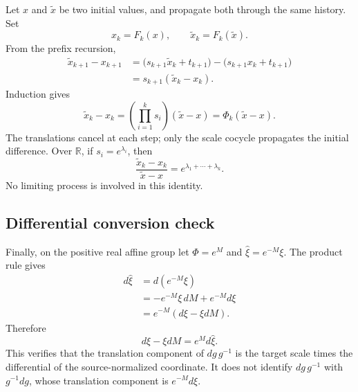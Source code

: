 Let $x$ and $\widetilde x$ be two initial values, and propagate both through
the same history.  Set
\[
  x_k=F_k(x),
  \qquad
  \widetilde x_k=F_k(\widetilde x).
\]
From the prefix recursion,
\begin{align*}
  \widetilde x_{k+1}-x_{k+1}
  &=\bigl(s_{k+1}\widetilde x_k+t_{k+1}\bigr)
    -\bigl(s_{k+1}x_k+t_{k+1}\bigr)\\
  &=s_{k+1}(\widetilde x_k-x_k).
\end{align*}
Induction gives
\begin{equation}
  \widetilde x_k-x_k
  =\left(\prod_{i=1}^{k}s_i\right)(\widetilde x-x)
  =\Phi_k(\widetilde x-x).
  \label{eq:appendix-prefix-perturbation}
\end{equation}
The translations cancel at each step; only the scale cocycle propagates the
initial difference.  Over $\mathbb R$, if $s_i=e^{\lambda_i}$, then
\[
  \frac{\widetilde x_k-x_k}{\widetilde x-x}
  =e^{\lambda_1+\cdots+\lambda_k}.
\]
No limiting process is involved in this identity.

\subsection{Differential conversion check}

Finally, on the positive real affine group let $\Phi=e^M$ and
$\widehat\xi=e^{-M}\xi$.  The product rule gives
\begin{align*}
  d\widehat\xi
  &=d(e^{-M}\xi)\\
  &=-e^{-M}\xi\,dM+e^{-M}d\xi\\
  &=e^{-M}(d\xi-\xi dM).
\end{align*}
Therefore
\[
  d\xi-\xi dM=e^M d\widehat\xi.
\]
This verifies that the translation component of $dg\,g^{-1}$ is the target
scale times the differential of the source-normalized coordinate.  It does
not identify $dg\,g^{-1}$ with $g^{-1}dg$, whose translation component is
$e^{-M}d\xi$.
